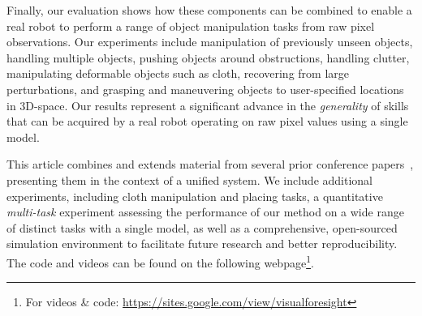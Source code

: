 Finally, our evaluation shows how these components can be combined to enable a real robot to perform a range of object manipulation tasks from raw pixel observations. Our experiments include manipulation of previously unseen objects, handling multiple objects, pushing objects around obstructions, handling clutter, manipulating deformable objects such as cloth, recovering from large perturbations, and grasping and maneuvering objects to user-specified locations in 3D-space. Our results represent a significant advance in the \emph{generality} of skills that can be acquired by a real robot operating on raw pixel values using a single model.

This article combines and extends material from several prior conference papers~\cite{foresight,sna,ebert2018robustness,flo}, presenting them in the context of a unified system. We include additional experiments, including cloth manipulation and placing tasks, a quantitative \emph{multi-task} experiment assessing the performance of our method on a wide range of distinct tasks with a single model, as well as a comprehensive, open-sourced simulation environment to facilitate future research and better reproducibility. The code and videos can be found on the following webpage\footnote{For videos \& code: \url{https://sites.google.com/view/visualforesight}}.

